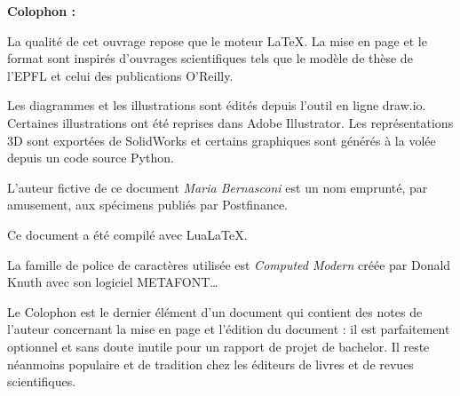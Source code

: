 \clearpage
\Large\textbf{Colophon :}\par\normalsize
\thispagestyle{empty}
La qualité de cet ouvrage repose que le moteur \LaTeX. La mise en page et le format sont inspirés d'ouvrages scientifiques tels que le modèle de thèse de l'EPFL et celui des publications O'Reilly.

Les diagrammes et les illustrations sont édités depuis l'outil en ligne draw.io. Certaines illustrations ont été reprises dans Adobe Illustrator. Les représentations 3D sont exportées de SolidWorks et certains graphiques sont générés à la volée depuis un code source Python.

L'auteur fictive de ce document \emph{Maria Bernasconi} est un nom emprunté, par amusement, aux spécimens publiés par Postfinance.

Ce document a été compilé avec LuaLaTeX.

La famille de police de caractères utilisée est \emph{Computed Modern} créée par Donald Knuth avec son logiciel METAFONT\dots

\vfil

Le Colophon est le dernier élément d'un document qui contient des notes de l'auteur concernant la mise en page et l'édition du document : il est parfaitement optionnel et sans doute inutile pour un rapport de projet de bachelor. Il reste néanmoins populaire et de tradition chez les éditeurs de livres et de revues scientifiques.
